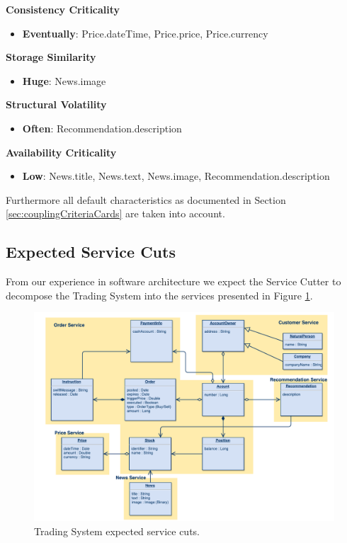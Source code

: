 \textbf{Consistency Criticality}

\begin{itemize}
\item \textbf{Eventually}: Price.dateTime, Price.price, Price.currency
\end{itemize}

\textbf{Storage Similarity}

\begin{itemize}
\item \textbf{Huge}: News.image
\end{itemize}

\textbf{Structural Volatility}

\begin{itemize}
\item \textbf{Often}: Recommendation.description
\end{itemize}

\textbf{Availability Criticality}

\begin{itemize}
\item \textbf{Low}: News.title, News.text, News.image, Recommendation.description
\end{itemize}

Furthermore all default characteristics as documented in Section \ref{sec:couplingCriteriaCards} are taken into account.

\subsection{Expected Service Cuts}

From our experience in software architecture we expect the Service Cutter to decompose the Trading System into the services presented in Figure \ref{fig:tradingCuts}.


\begin{figure}[H]
	\includegraphics[scale=0.5]{diagrams/TradingSystem-ServiceCut.pdf}
	\caption{Trading System expected service cuts.}
	\label{fig:tradingCuts}
\end{figure}


